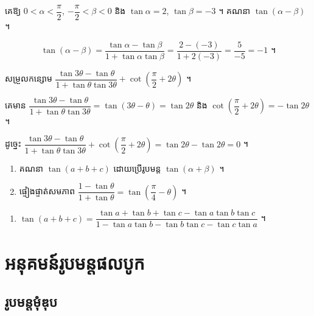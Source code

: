 \begin{example}[លំហាត់គំរូ ៣]
គេឱ្យ $0 < \alpha < \dfrac{\pi}{2}$, $-\dfrac{\pi}{2} < \beta < 0$ និង $\tan\alpha = 2$, $\tan\beta = -3$ ។ គណនា $\tan(\alpha - \beta)$ ។
\end{example}
\ans
\[ \tan(\alpha - \beta) = \frac{\tan\alpha - \tan\beta}{1 + \tan\alpha\tan\beta} = \frac{2 - (-3)}{1 + 2(-3)} = \frac{5}{-5} = -1 \text{ ។} \]

\begin{example}[លំហាត់គំរូ ៤]
សម្រួលកន្សោម $\dfrac{\tan 3\theta - \tan\theta}{1 + \tan\theta\tan 3\theta} + \cot\left(\dfrac{\pi}{2} + 2\theta\right)$ ។
\end{example}
\ans
គេមាន $\dfrac{\tan 3\theta - \tan\theta}{1 + \tan\theta\tan 3\theta} = \tan(3\theta - \theta) = \tan 2\theta$ និង $\cot\left(\dfrac{\pi}{2} + 2\theta\right) = -\tan 2\theta$ ។

ដូច្នេះ $\dfrac{\tan 3\theta - \tan\theta}{1 + \tan\theta\tan 3\theta} + \cot\left(\dfrac{\pi}{2} + 2\theta\right) = \tan 2\theta - \tan 2\theta = 0$ ។

\begin{pro}
\begin{enumerate}[1]
  \item គណនា $\tan(a + b + c)$ ដោយប្រើរូបមន្ត $\tan(\alpha + \beta)$ ។
  \item ផ្ទៀងផ្ទាត់សមភាព $\dfrac{1 - \tan\theta}{1 + \tan\theta} = \tan\left(\dfrac{\pi}{4} - \theta\right)$ ។
\end{enumerate}
\ans
\begin{enumerate}[1]
  \item $\tan(a + b + c) = \dfrac{\tan a + \tan b + \tan c - \tan a\tan b\tan c}{1 - \tan a\tan b - \tan b\tan c - \tan c\tan a}$ ។
\end{enumerate}
\end{pro}

\section{អនុគមន៍រូបមន្តផលបូក}

\subsection{រូបមន្តមុំឌុប}

